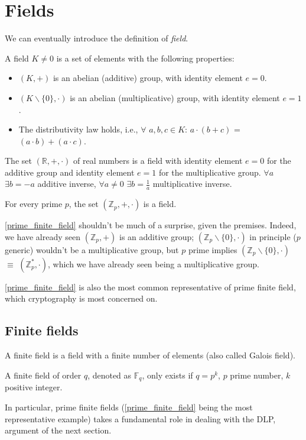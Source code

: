 \section{Fields}
We can eventually introduce the definition of \textit{field}.
\begin{mydef}
    A field $K\neq0$ is a set of elements with the following properties:
    \begin{itemize}
        \item $(K,+)$ is an abelian (additive) group, with identity element $e=0$.
        \item $(K\backslash\{0\},\cdot)$ is an abelian (multiplicative) group, with identity element $e=1$.
        \item The distributivity law holds, i.e., $\forall$ $a,b,c \in K$: $a \cdot (b+c)$ = $(a\cdot b) + (a\cdot c)$.
    \end{itemize}
\end{mydef}
\begin{myexample}
    The set $(\mathbb{R},+,\cdot)$ of real numbers is a field with identity element $e=0$ for the additive group and identity element $e=1$ for the multiplicative group. $\forall a$ $\exists b = -a$ additive inverse, $\forall a\neq 0$ $\exists b =\frac{1}{a}$ multiplicative inverse.
\end{myexample}
\begin{myexample}
\label{prime_finite_field}
    For every prime $p$, the set $(\mathbb{Z}_p,+,\cdot)$ is a field.
\end{myexample}
\begin{myrem}
    \ref{prime_finite_field} shouldn't be much of a surprise, given the premises. Indeed, we have already seen $(\mathbb{Z}_p,+)$ is an additive group; $(\mathbb{Z}_p\backslash\{0\},\cdot)$ in principle ($p$ generic) wouldn't be a multiplicative group, but $p$ prime implies $(\mathbb{Z}_p\backslash\{0\},\cdot)$ $\equiv$ $(\mathbb{Z}_p^{*},\cdot)$, which we have already seen being a multiplicative group.
\end{myrem}
\begin{myrem}
    \ref{prime_finite_field} is also the most common representative of prime finite field, which cryptography is most concerned on.
\end{myrem}
\subsection{Finite fields}
\begin{mydef}
    A finite field is a field with a finite number of elements (also called Galois field).
\end{mydef}
\begin{mytheorem}
    A finite field of order $q$, denoted as $\mathbb{F}_q$, only exists if $q = p^k$, $p$ prime number, $k$ positive integer.
\end{mytheorem}
\noindent
In particular, prime finite fields (\ref{prime_finite_field} being the most representative example) takes a fundamental role in dealing with the DLP, argument of the next section.
